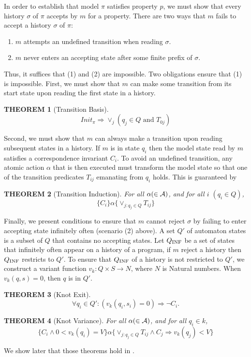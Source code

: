 \documentclass[12pt,a4paper,titlepage]{article}
\theoremstyle{break}
\newtheorem{theorem}{THEOREM}[section]
\begin{document}
In order to establish that model $\pi$ satisfies property $p$, we must show that every history $\sigma$ of $\pi$ accepts by $m$ for a property.
There are two ways that $m$ fails to accept a history \(\sigma\) of $\pi$:
  \begin{enumerate}
\item $m$ attempts an undefined transition when reading \(\sigma\).
\item $m$ never enters an accepting state after some finite prefix of \(\sigma\).
  \end{enumerate}
Thus, it suffices that (1) and (2) are impossible.
Two obligations ensure that (1) is impossible.
First, we must show that $m$ can make some transition from its start state upon reading the first state in a history.
  \begin{theorem}[Transition Basis]
    \begin{displaymath}
Init_{\pi}\Rightarrow\vee_{j}(q_j\in Q\mbox{ and }T_{0j})
    \end{displaymath}
  \end{theorem}
Second, we must show that $m$ can always make a transition upon reading subsequent states in a history.
If $m$ is in state \(q_i\) then the model state read by $m$ satisfies a correspondence invariant \(C_i\).
To avoid an undefined transition, any atomic action \(\alpha\) that is then executed must transform the model state so that one of the transition predicates \(T_{ij}\) emanating from \(q_i\) holds.
This is guaranteed by 
  \begin{theorem}[Transition Induction]
For all \(\alpha (\in {\cal A})\), and for all $i$ \((q_i\in Q)\),
    \begin{displaymath}
\{C_i\}\alpha\{\vee_{j:q_j\in Q}T_{ij}\}
    \end{displaymath}
  \end{theorem}

Finally, we present conditions to ensure that $m$ cannot reject \(\sigma\) by failing to enter accepting state infinitely often (scenario (2) above).
A set $Q'$ of automaton states is a subset of $Q$ that contains no accepting states.
Let \(Q_{\mathop{\mathrm{INF}}\nolimits}\) be a set of states that infinitely often appear on a history of a program,
if $m$ reject a history then \(Q_{\mathop{\mathrm{INF}}\nolimits}\) restricts to $Q'$.
To ensure that \(Q_{\mathop{\mathrm{INF}}\nolimits}\) of a history is not restricted to $Q'$, we construct a variant function
 \(v_k:Q\times S\rightarrow N\), where $N$ is Natural numbers.
When \(v_k(q,s)=0\), then $q$ is in $Q'$.
  \begin{theorem}[Knot Exit]
    \begin{displaymath}
\forall q_i\in Q'\colon (v_k(q_i,s_i)=0)\Rightarrow \neg C_i.
    \end{displaymath}
  \end{theorem}
  \begin{theorem}[Knot Variance]
For all \(\alpha (\in {\cal A})\), and for all \(q_i\in k\),
    \begin{displaymath}
\{C_i\wedge0<v_k(q_i)=V\}\alpha\{\vee_{j:q_j\in Q}T_{ij}\wedge C_j\Rightarrow v_k(q_j)<V\}
    \end{displaymath}
  \end{theorem}
We show later that those theorems hold in \NHK.
%
%
\end{document}
